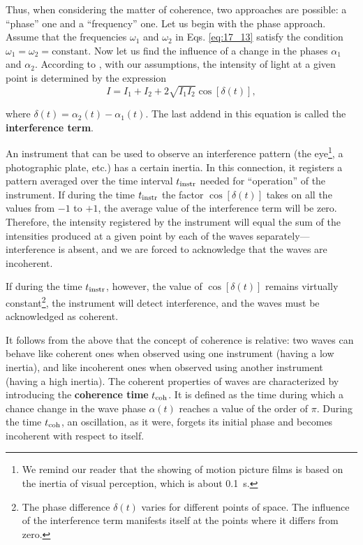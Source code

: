 Thus, when considering the matter of coherence, two approaches are possible: a ``phase'' one and a ``frequency'' one.
Let us begin with the phase approach.
Assume that the frequencies $\omega_1$ and $\omega_2$ in Eqs. \eqref{eq:17_13} satisfy the condition $\omega_1 = \omega_2 = \text{constant}$.
Now let us find the influence of a change in the phases $\alpha_1$ and $\alpha_2$.
According to , with our assumptions, the intensity of light at a given point is determined by the expression
\begin{equation*}
    I = I_1 + I_2 + 2 \sqrt{I_1 I_2} \cos[\delta(t)],
\end{equation*}

\noindent
where $\delta(t) = \alpha_2(t) - \alpha_1(t)$.
The last addend in this equation is called the \textbf{interference term}.

An instrument that can be used to observe an interference pattern (the eye\footnote{We remind our reader that the showing of motion picture films is based on the inertia of visual perception, which is about \SI{0.1}{\second}.}, a photographic plate, etc.) has a certain inertia.
In this connection, it registers a pattern averaged over the time interval $t_{\text{instr}}$ needed for ``operation'' of the instrument.
If during the time $t_{\text{instr}}$ the factor $\cos[\delta(t)]$ takes on all the values from $-1$ to $+1$, the average value of the interference term will be zero.
Therefore, the intensity registered by the instrument will equal the sum of the intensities produced at a given point by each of the waves separately---interference is absent, and we are forced to acknowledge that the waves are incoherent.

If during the time $t_{\text{instr}}$, however, the value of $\cos[\delta(t)]$ remains virtually constant\footnote{The phase difference $\delta(t)$ varies for different points of space. The influence of the interference term manifests itself at the points where it differs from zero.}, the instrument will detect interference, and the waves must be acknowledged as coherent.

It follows from the above that the concept of coherence is relative: two waves can behave like coherent ones when observed using one instrument (having a low inertia), and like incoherent ones when observed using another instrument (having a high inertia).
The coherent properties of waves are characterized by introducing the \textbf{coherence time} $t_{\text{coh}}$.
It is defined as the time during which a chance change in the wave phase $\alpha(t)$ reaches a value of the order of $\pi$.
During the time $t_{\text{coh}}$, an oscillation, as it were, forgets its initial phase and becomes incoherent with respect to itself.

